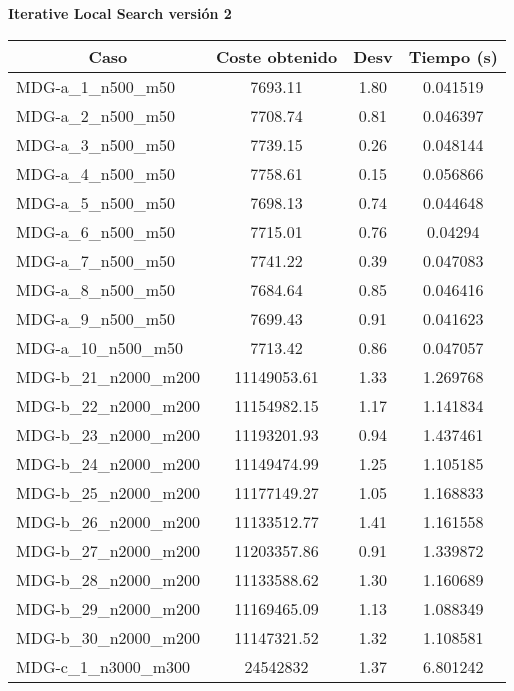 \documentclass[11pt,a4paper]{article}
\begin{document}
	\newpage		
\textbf{Iterative Local Search versión 2}
\begin{table}[H]
	\begin{center}
		\begin{tabular}{|l|c|c|c|} 
			\hline
			\multicolumn{1}{|c|}{\textbf{Caso}} & \textbf{Coste obtenido} & \textbf{Desv} & \textbf{Tiempo (s)} \\ \hline
					MDG-a\_1\_n500\_m50 & 7693.11 & 1.80 & 0.041519 \\ \hline
					MDG-a\_2\_n500\_m50 & 7708.74 & 0.81 & 0.046397 \\ \hline
					MDG-a\_3\_n500\_m50 & 7739.15 & 0.26 & 0.048144 \\ \hline
					MDG-a\_4\_n500\_m50 & 7758.61 & 0.15 & 0.056866 \\ \hline
					MDG-a\_5\_n500\_m50 & 7698.13 & 0.74 & 0.044648 \\ \hline
					MDG-a\_6\_n500\_m50 & 7715.01 & 0.76 & 0.04294 \\ \hline
					MDG-a\_7\_n500\_m50 & 7741.22 & 0.39 & 0.047083 \\ \hline
					MDG-a\_8\_n500\_m50 & 7684.64 & 0.85 & 0.046416 \\ \hline
					MDG-a\_9\_n500\_m50 & 7699.43 & 0.91 & 0.041623 \\ \hline
					MDG-a\_10\_n500\_m50 & 7713.42 & 0.86 & 0.047057 \\ \hline
					MDG-b\_21\_n2000\_m200 & 11149053.61 & 1.33 & 1.269768 \\ \hline
					MDG-b\_22\_n2000\_m200 & 11154982.15 & 1.17 & 1.141834 \\ \hline
					MDG-b\_23\_n2000\_m200 & 11193201.93 & 0.94 & 1.437461 \\ \hline
					MDG-b\_24\_n2000\_m200 & 11149474.99 & 1.25 & 1.105185 \\ \hline
					MDG-b\_25\_n2000\_m200 & 11177149.27 & 1.05 & 1.168833 \\ \hline
					MDG-b\_26\_n2000\_m200 & 11133512.77 & 1.41 & 1.161558 \\ \hline
					MDG-b\_27\_n2000\_m200 & 11203357.86 & 0.91 & 1.339872 \\ \hline
					MDG-b\_28\_n2000\_m200 & 11133588.62 & 1.30 & 1.160689 \\ \hline
					MDG-b\_29\_n2000\_m200 & 11169465.09 & 1.13 & 1.088349 \\ \hline
					MDG-b\_30\_n2000\_m200 & 11147321.52 & 1.32 & 1.108581 \\ \hline
					MDG-c\_1\_n3000\_m300 & 24542832 & 1.37 & 6.801242 \\ \hline

\end{tabular}
\end{center}
\end{table}
\end{document}
